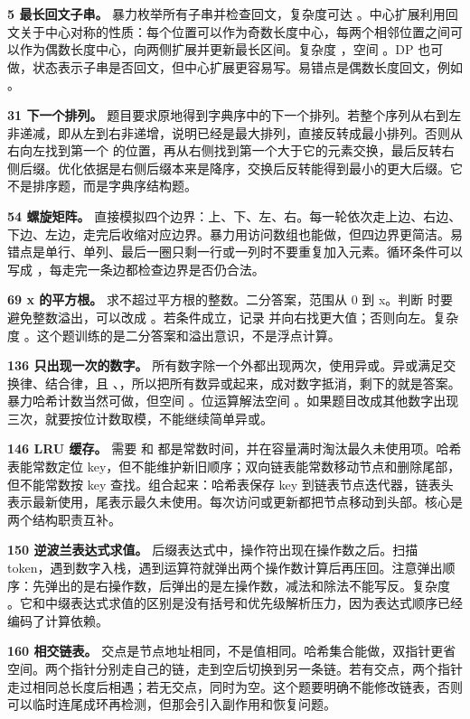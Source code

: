 \textbf{5 最长回文子串。} 暴力枚举所有子串并检查回文，复杂度可达 。中心扩展利用回文关于中心对称的性质：每个位置可以作为奇数长度中心，每两个相邻位置之间可以作为偶数长度中心，向两侧扩展并更新最长区间。复杂度 ，空间 。DP 也可做，状态表示子串是否回文，但中心扩展更容易写。易错点是偶数长度回文，例如 。

\textbf{31 下一个排列。} 题目要求原地得到字典序中的下一个排列。若整个序列从右到左非递减，即从左到右非递增，说明已经是最大排列，直接反转成最小排列。否则从右向左找到第一个  的位置，再从右侧找到第一个大于它的元素交换，最后反转右侧后缀。优化依据是右侧后缀本来是降序，交换后反转能得到最小的更大后缀。它不是排序题，而是字典序结构题。

\textbf{54 螺旋矩阵。} 直接模拟四个边界：上、下、左、右。每一轮依次走上边、右边、下边、左边，走完后收缩对应边界。暴力用访问数组也能做，但四边界更简洁。易错点是单行、单列、最后一圈只剩一行或一列时不要重复加入元素。循环条件可以写成 ，每走完一条边都检查边界是否仍合法。

\textbf{69 x 的平方根。} 求不超过平方根的整数。二分答案，范围从 0 到 x。判断  时要避免整数溢出，可以改成 。若条件成立，记录  并向右找更大值；否则向左。复杂度 。这个题训练的是二分答案和溢出意识，不是浮点计算。

\textbf{136 只出现一次的数字。} 所有数字除一个外都出现两次，使用异或。异或满足交换律、结合律，且 、，所以把所有数异或起来，成对数字抵消，剩下的就是答案。暴力哈希计数当然可做，但空间 。位运算解法空间 。如果题目改成其他数字出现三次，就要按位计数取模，不能继续简单异或。

\textbf{146 LRU 缓存。} 需要  和  都是常数时间，并在容量满时淘汰最久未使用项。哈希表能常数定位 key，但不能维护新旧顺序；双向链表能常数移动节点和删除尾部，但不能常数按 key 查找。组合起来：哈希表保存 key 到链表节点迭代器，链表头表示最新使用，尾表示最久未使用。每次访问或更新都把节点移动到头部。核心是两个结构职责互补。

\textbf{150 逆波兰表达式求值。} 后缀表达式中，操作符出现在操作数之后。扫描 token，遇到数字入栈，遇到运算符就弹出两个操作数计算后再压回。注意弹出顺序：先弹出的是右操作数，后弹出的是左操作数，减法和除法不能写反。复杂度 。它和中缀表达式求值的区别是没有括号和优先级解析压力，因为表达式顺序已经编码了计算依赖。

\textbf{160 相交链表。} 交点是节点地址相同，不是值相同。哈希集合能做，双指针更省空间。两个指针分别走自己的链，走到空后切换到另一条链。若有交点，两个指针走过相同总长度后相遇；若无交点，同时为空。这个题要明确不能修改链表，否则可以临时连尾成环再检测，但那会引入副作用和恢复问题。

